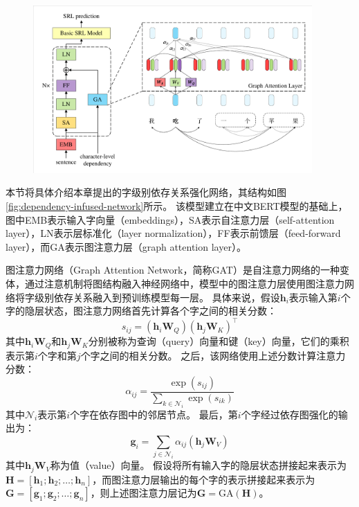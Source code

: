 \begin{figure}[hbtp]
	\centering
	\includegraphics[width=0.95\textwidth]{figures/dependency-infused-network.pdf}
\end{figure}

本节将具体介绍本章提出的字级别依存关系强化网络，其结构如图\ref{fig:dependency-infused-network}所示。
该模型建立在中文BERT模型的基础上，图中EMB表示输入字向量（embeddings），SA表示自注意力层（self-attention layer），LN表示层标准化（layer normalization），FF表示前馈层（feed-forward layer），而GA表示图注意力层（graph attention layer）。

图注意力网络\cite{velickovic-etal-2018-gat}（Graph Attention Network，简称GAT）是自注意力网络的一种变体，通过注意机制将图结构融入神经网络中，模型中的图注意力层使用图注意力网络将字级别依存关系融入到预训练模型每一层。
具体来说，假设$\bm{h}_i$表示输入第$i$个字的隐层状态，图注意力网络首先计算各个字之间的相关分数：
\begin{equation}
    \label{eq:inter-score}
    s_{ij} = (\bm{h}_i\bm{W}_Q)(\bm{h}_j\bm{W}_K)^{\top}
\end{equation}
其中$\bm{h}_i\bm{W}_Q$和$\bm{h}_j\bm{W}_K$分别被称为查询（query）向量和键（key）向量，它们的乘积表示第$i$个字和第$j$个字之间的相关分数。
之后，该网络使用上述分数计算注意力分数：
\begin{equation}
\label{eq:att-score}
	\alpha_{ij} =\frac{\exp(s_{ij})}{\sum_{k\in\mathcal{N}_i}\exp(s_{ik})}
\end{equation}
其中$\mathcal{N}_i$表示第$i$个字在依存图中的邻居节点。
最后，第$i$个字经过依存图强化的输出为：
\begin{equation}
    \label{eq:gat-output}
	\bm{g}_i =\sum_{j\in \mathcal{N}_i}\alpha_{ij}(\bm{h}_j\bm{W}_V)
\end{equation}
其中$\bm{h}_j\bm{W}_V$称为值（value）向量。
假设将所有输入字的隐层状态拼接起来表示为$\bm{H} = [\bm{h}_1;\bm{h}_2; \dots; \bm{h}_n]$，而图注意力层输出的每个字的表示拼接起来表示为$\bm{G} = [\bm{g}_1;\bm{g}_2; \dots; \bm{g}_n]$，则上述图注意力层记为$\bm{G} = \text{GA}(\bm{H})$。

